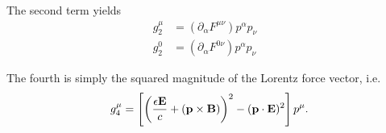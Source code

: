 \documentclass[10pt,letterpaper,extrafontsizes, onecolumn,openright]{memoir}
\begin{document}
The second term yields
  \begin{align*}
    g_2^\mu &= \left(\partial_\alpha F^{\mu\nu}\right)p^\alpha p_\nu & \\
    g_2^0   &= \left(\partial_\alpha F^{0\nu}\right)p^\alpha p_\nu   &
  \end{align*}

The fourth is simply the squared magnitude of the Lorentz force vector, i.e.
  \begin{equation}
    g_4^\mu = \left[\left(\frac{\epsilon\vb{E}}{c}+\left(\vb{p}\times\vb{B}\right)\right)^2-(\vb{p}\cdot\vb{E})^2\right] p^\mu.
  \end{equation}

\appendix



\end{document}

